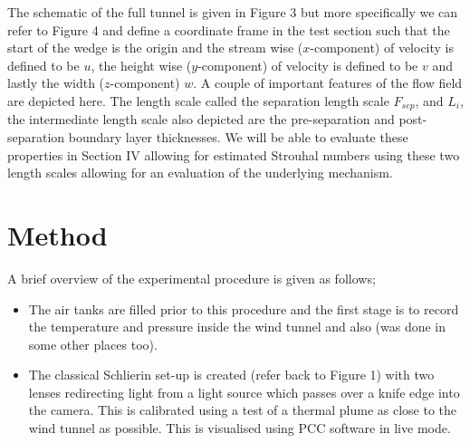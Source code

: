 \documentclass[a4paper,10pt,twoside]{article}
\begin{document}
\begin{multicols}{2}
The schematic of the full tunnel is given in Figure 3 but more specifically we can refer to Figure 4 and define a coordinate frame in the test section such that the start of the wedge is the origin and the stream wise ($x$-component) of velocity is defined to be $u$, the height wise ($y$-component) of velocity is defined to be $v$ and lastly the width ($z$-component) $w$. A couple of important features of the flow field are depicted here. The length scale called the separation length scale $F_{sep}$, and $L_i$, the intermediate length scale also depicted are the pre-separation and post-separation boundary layer thicknesses. We will be able to evaluate these properties in Section IV allowing for estimated Strouhal numbers using these two length scales allowing for an evaluation of the underlying mechanism. \par 










\section{Method}





A brief overview of the experimental procedure is given as follows;



\begin{itemize}



    \item The air tanks are filled prior to this procedure and the first stage is to record the temperature and pressure inside the wind tunnel and also (was done in some other places too).
    
    
    
    \item The classical Schlierin set-up is created (refer back to Figure 1) with two lenses redirecting light from a light source which passes over a knife edge into the camera. This is calibrated using a test of a thermal plume as close to the wind tunnel as possible. This is visualised using PCC software in live mode.
    

\end{itemize}
\end{multicols}
\end{document}
